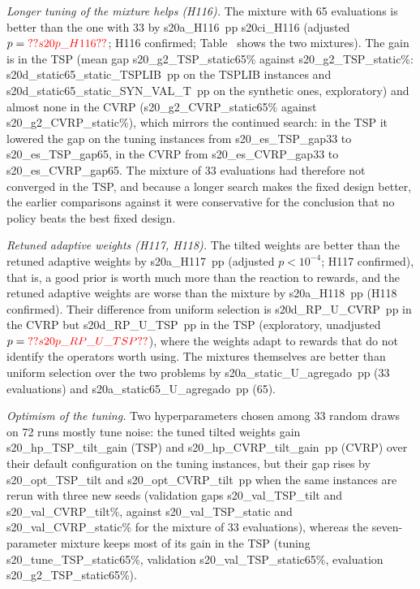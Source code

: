 \emph{Longer tuning of the mixture helps (H116).} The mixture with 65 evaluations is better than the one with 33 by \num{s20a_H116}~pp \num{s20ci_H116} (adjusted $p=\num{s20p_H116}$; H116 confirmed; Table~ shows the two mixtures). The gain is in the TSP (mean gap \num{s20_g2_TSP_static65}\% against \num{s20_g2_TSP_static}\%: \num{s20d_static65_static_TSPLIB}~pp on the TSPLIB instances and \num{s20d_static65_static_SYN_VAL_T}~pp on the synthetic ones, exploratory) and almost none in the CVRP (\num{s20_g2_CVRP_static65}\% against \num{s20_g2_CVRP_static}\%), which mirrors the continued search: in the TSP it lowered the gap on the tuning instances from \num{s20_es_TSP_gap33} to \num{s20_es_TSP_gap65}, in the CVRP from \num{s20_es_CVRP_gap33} to \num{s20_es_CVRP_gap65}. The mixture of 33 evaluations had therefore not converged in the TSP, and because a longer search makes the fixed design better, the earlier comparisons against it were conservative for the conclusion that no policy beats the best fixed design.

\emph{Retuned adaptive weights (H117, H118).} The tilted weights are better than the retuned adaptive weights by \num{s20a_H117}~pp (adjusted $p<10^{-4}$; H117 confirmed), that is, a good prior is worth much more than the reaction to rewards, and the retuned adaptive weights are worse than the mixture by \num{s20a_H118}~pp (H118 confirmed). Their difference from uniform selection is \num{s20d_RP_U_CVRP}~pp in the CVRP but \num{s20d_RP_U_TSP}~pp in the TSP (exploratory, unadjusted $p=\num{s20p_RP_U_TSP}$), where the weights adapt to rewards that do not identify the operators worth using. The mixtures themselves are better than uniform selection over the two problems by \num{s20a_static_U_agregado}~pp (33 evaluations) and \num{s20a_static65_U_agregado}~pp (65).

\emph{Optimism of the tuning.} Two hyperparameters chosen among 33 random draws on 72 runs mostly tune noise: the tuned tilted weights gain \num{s20_hp_TSP_tilt_gain} (TSP) and \num{s20_hp_CVRP_tilt_gain}~pp (CVRP) over their default configuration on the tuning instances, but their gap rises by \num{s20_opt_TSP_tilt} and \num{s20_opt_CVRP_tilt}~pp when the same instances are rerun with three new seeds (validation gaps \num{s20_val_TSP_tilt} and \num{s20_val_CVRP_tilt}\%, against \num{s20_val_TSP_static} and \num{s20_val_CVRP_static}\% for the mixture of 33 evaluations), whereas the seven-parameter mixture keeps most of its gain in the TSP (tuning \num{s20_tune_TSP_static65}\%, validation \num{s20_val_TSP_static65}\%, evaluation \num{s20_g2_TSP_static65}\%).


